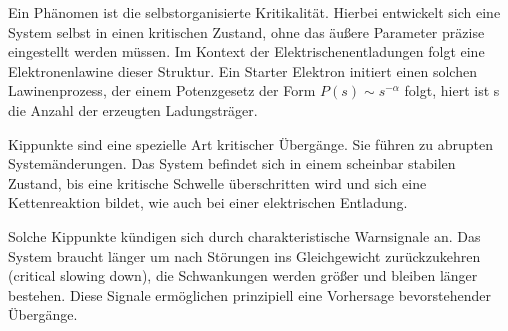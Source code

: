 Ein Phänomen ist die selbstorganisierte Kritikalität. Hierbei entwickelt sich eine System selbst in einen kritischen Zustand, ohne das äußere Parameter präzise eingestellt werden müssen. Im Kontext der Elektrischenentladungen folgt eine Elektronenlawine dieser Struktur. Ein Starter Elektron initiert einen solchen Lawinenprozess, der einem Potenzgesetz der Form \(P(s) \sim s^{-\alpha}\) folgt, hiert ist s die Anzahl der erzeugten Ladungsträger.

Kippunkte sind eine spezielle Art kritischer Übergänge. Sie führen zu abrupten Systemänderungen. Das System befindet sich in einem scheinbar stabilen Zustand, bis eine kritische Schwelle überschritten wird und sich eine Kettenreaktion bildet, wie auch bei einer elektrischen Entladung.

Solche Kippunkte kündigen sich durch charakteristische Warnsignale an. Das System braucht länger um nach Störungen ins Gleichgewicht zurückzukehren (critical slowing down), die Schwankungen werden größer und bleiben länger bestehen. Diese Signale ermöglichen prinzipiell eine Vorhersage bevorstehender Übergänge. \cite{Scheffer2009}
